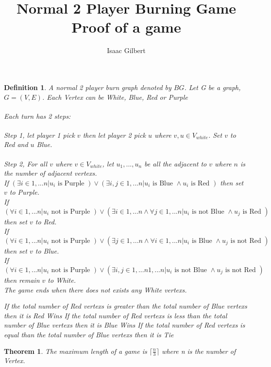 \documentclass{article}
\newtheorem{theorem}{Theorem}
\newtheorem{definition}{Definition}
\begin{document}
\title{Normal 2 Player Burning Game Proof of a game}
\author{Isaac Gilbert}
\date{} %
\maketitle

\begin{definition}
A normal 2 player burn graph denoted by \(BG\). Let G be a graph, \(G=(V,E)\). 
Each Vertex can be White, Blue, Red or Purple
\\\\Each turn has 2 steps:
\\\\Step 1, let player 1 pick \(v\) then let player 2 pick \(u\) where \( v,u \in V_{white} \). Set \(v\) to Red and \(u\) Blue.
\\\\Step 2, For all \(v\) where \( v\in V_{white} \), let \({u_1,...,u_n}\) be all the adjacent to \(v\) where \(n\) is the number of adjacent vertexs.\\
If \((\exists i \in {1,...n} | u_i \text{ is Purple } )\vee (\exists i,j \in {1,...n} | u_i \text{ is Blue } \wedge u_i \text{ is Red })\) then set \(v\) to Purple.\\ 
If \((\forall i \in {1,...n} | u_i \text{ not is Purple }) \vee (\exists i \in {1,...n} \wedge \forall j \in {1,...n} | u_i \text{ is not Blue } \wedge u_j \text{ is Red })\) then set \(v\) to Red.\\ 
If \((\forall i \in {1,...n} | u_i \text{ not is Purple }) \vee (\exists j \in {1,...n} \wedge \forall i \in {1,...n} | u_i \text{ is Blue } \wedge u_j \text{ is not Red })\) then set \(v\) to Blue.\\ 
If \((\forall i \in {1,...n} | u_i \text{ not is Purple }) \vee (\exists i,j \in {1,...n} {1,...n} | u_i \text{ is not Blue } \wedge u_j \text{ is not Red })\) then remain \(v\) to White.\\ 

The game ends when there does not exists any White vertexs.

If the total number of Red vertexs is greater than the total number of Blue vertexs then it is Red Wins
If the total number of Red vertexs is less than the total number of Blue vertexs then it is Blue Wins
If the total number of Red vertexs is equal than the total number of Blue vertexs then it is Tie
\end{definition}

\begin{theorem}
The maximum length of a game is $\lceil \frac{n}{3} \rceil$ where n is the number of Vertex.
\end{theorem}
\end{document}
